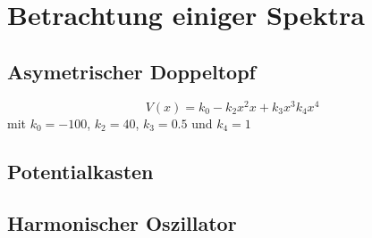 \documentclass[10pt,a4paper,german]{scrartcl}
\begin{document}
  \section{Betrachtung einiger Spektra}
  	\subsection{Asymetrischer Doppeltopf}
  		\begin{equation}
  			V(x)= k_0 - k_2 x^2 x + k_3 x^3 k_4 x^4
  		\end{equation}
  		mit $k_0 = -100$, $k_2=40$, $k_3=0.5$ und $k_4=1$
  	\subsection{Potentialkasten}
  	\subsection{Harmonischer Oszillator}
\end{document}

